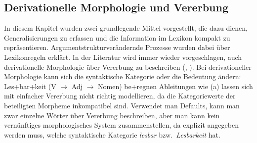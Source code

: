 

\subsection{Derivationelle Morphologie und Vererbung}
\label{sec-derivation-vererbung}

%
In diesem Kapitel wurden zwei grundlegende Mittel vorgestellt, die dazu dienen,
Generalisierungen zu erfassen und die Information im Lexikon kompakt zu repräsentieren.
Argumentstrukturverändernde Prozesse wurden dabei über Lexikonregeln erklärt. In der Literatur
wird immer wieder vorgeschlagen, auch derivationelle Morphologie über Vererbung zu beschreiben
(\citealp*[]{RCWA91a}, \citealp{MR2001a}).
Bei derivationeller Morphologie kann sich die syntaktische Kategorie oder die Bedeutung ändern:
\eal
\ex Les+bar+keit (V $\to$ Adj $\to$ Nomen)
\ex be+regnen
\zl
Ableitungen wie (a) lassen sich mit einfacher Vererbung nicht richtig modellieren, da
die Kategoriewerte der beteiligten Morpheme inkompatibel sind. Verwendet man Defaults, kann man
zwar einzelne Wörter über Vererbung beschreiben, aber man kann kein vernünftiges morphologisches
System zusammenstellen, da explizit angegeben werden muss, welche syntaktische Kategorie \emph{lesbar}
bzw.\ \emph{Lesbarkeit} hat.

